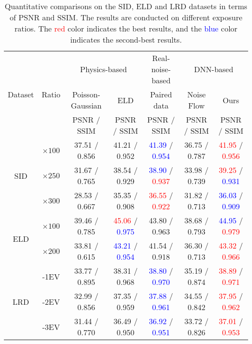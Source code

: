 \documentclass[10pt,twocolumn,letterpaper]{article}
\begin{document}
\begin{table*}[!t]
\centering
\caption{Quantitative comparisons on the SID, ELD and LRD datasets in terms of PSNR and SSIM. The results are conducted on different exposure ratios. The \textcolor{red}{red} color indicates the best results, and the \textcolor{blue}{blue} color indicates the second-best results.}
\vspace{2pt}
\begin{tabular}{ccccccc}
\toprule[1.5pt]
\multirow{3}{*}{Dataset} & \multirow{3}{*}{Ratio} & \multicolumn{2}{c}{Physics-based}                 & \multicolumn{1}{c}{Real-noise-based} & \multicolumn{2}{c}{DNN-based}   \\ \cline{3-7} 
&  & \multicolumn{1}{c}{Poisson-Gaussian} & \multicolumn{1}{c}{ELD} & \multicolumn{1}{c}{Paired data} & \multicolumn{1}{c}{Noise Flow} & \multicolumn{1}{c}{Ours} \\ \cline{3-7} 
&  & PSNR / SSIM & PSNR / SSIM &PSNR / SSIM  & PSNR / SSIM & PSNR / SSIM\\\hline
\multirow{3}{*}{SID}& $\times100$ &37.51 / 0.856 &41.21 / 0.952 &\textcolor{blue}{41.39} / \textcolor{blue}{0.954} &36.75 / 0.787 &\textcolor{red}{41.95} / \textcolor{red}{0.956}\\
& $\times250$ &31.67 / 0.765 &38.54 / 0.929 &\textcolor{blue}{38.90} / \textcolor{red}{0.937} &33.98 / 0.739 & \textcolor{red}{39.25} / \textcolor{blue}{0.931}\\
& $\times300$ &28.53 / 0.667 &35.35 / 0.908 &\textcolor{red}{36.55} / \textcolor{red}{0.922} &31.82 / 0.713 &\textcolor{blue}{36.03} / \textcolor{blue}{0.909}\\ \hline
\multirow{2}{*}{ELD} &$\times100$ &39.46 / 0.785 &\textcolor{red}{45.06} / \textcolor{blue}{0.975} &43.80 / 0.963 &38.68 / 0.793 &\textcolor{blue}{44.95} / \textcolor{red}{0.979} \\
& $\times200$ &33.81 / 0.615 &\textcolor{blue}{43.21} / \textcolor{blue}{0.954} &41.54 / 0.918 &36.30 / 0.713 &\textcolor{red}{43.32} / \textcolor{red}{0.966}\\ \hline
\multirow{3}{*}{LRD}& -1EV &33.77 / 0.895 &38.31 / 0.968 &\textcolor{blue}{38.80} / \textcolor{blue}{0.970} & 35.19 / 0.874 & \textcolor{red}{38.89} / \textcolor{red}{0.971} \\
& -2EV &32.99 / 0.856 &37.35 / 0.959 &\textcolor{blue}{37.88} / \textcolor{blue}{0.961} &34.55 / 0.842 &  \textcolor{red}{37.95} / \textcolor{red}{0.962} \\
& -3EV &31.44 / 0.770 &36.49 / 0.950 &\textcolor{blue}{36.92} / \textcolor{blue}{0.951} &33.72 / 0.826 & \textcolor{red}{37.01} / \textcolor{red}{0.953} \\
\bottomrule[1.5pt]
\end{tabular}
\label{table:psnr}
\vspace{-2ex}
\end{table*}
\end{document}

